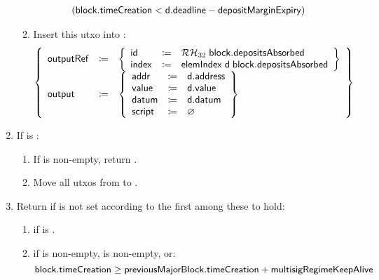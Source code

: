 \documentclass[../hydrozoa.tex]{subfiles}
\begin{document}
\begin{enumerate}
\begin{enumerate}
\begin{equation*}
\begin{split}
          &(\mathsf{block.timeCreation} < \mathsf{d.deadline} - \mathsf{depositMarginExpiry})
        \end{split}
        \end{equation*}
      \item Insert this utxo into :
        \begin{equation*}
          \left\{
          \begin{array}{lll}
            \mathsf{outputRef} &\coloneq& \left\{
              \begin{array}{lll}
                \mathsf{id} &\coloneq& \mathcal{RH}_{32} \; \mathsf{block.depositsAbsorbed} \\
                \mathsf{index} &\coloneq& \mathsf{elemIndex} \; \mathsf{d} \; \mathsf{block.depositsAbsorbed}
              \end{array}\right\} \\
            \mathsf{output} &\coloneq& \left\{
              \begin{array}{lll}
                \mathsf{addr} &\coloneq& \mathsf{d.address} \\
                \mathsf{value} &\coloneq& \mathsf{d.value} \\
                \mathsf{datum} &\coloneq& \mathsf{d.datum} \\
                \mathsf{script} &\coloneq& \varnothing
              \end{array}\right\}
          \end{array}\right\}
        \end{equation*}
    \end{enumerate}
  \item If  is :
    \begin{enumerate}
      \item If  is non-empty, return .
      \item Move all utxos from  to .
    \end{enumerate}
  \item Return  if  is not set according to the first among these to hold:
    \begin{enumerate}
      \item {} if  is .
      \item {} if  is non-empty,  is non-empty, or:
        \begin{equation*}
          \T{block.timeCreation} \geq \T{previousMajorBlock.timeCreation} + \T{multisigRegimeKeepAlive}

\end{equation*}
\end{enumerate}
\end{enumerate}
\end{document}

